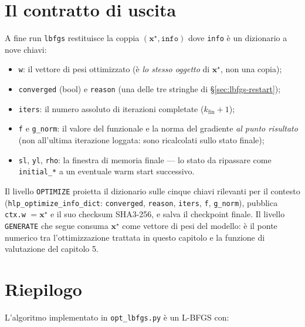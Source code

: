 \section{Il contratto di uscita}

A fine run \texttt{lbfgs} restituisce la coppia
$(\bm{x}^{\star}, \texttt{info})$ dove \texttt{info} è un dizionario a
nove chiavi:
\begin{itemize}
\item \texttt{w}: il vettore di pesi ottimizzato (è \emph{lo stesso
  oggetto} di $\bm{x}^{\star}$, non una copia);
\item \texttt{converged} (bool) e \texttt{reason} (una delle tre stringhe
  di \S\ref{sec:lbfgs-restart});
\item \texttt{iters}: il numero assoluto di iterazioni completate
  ($k_{\mathrm{fin}} + 1$);
\item \texttt{f} e \texttt{g\_norm}: il valore del funzionale e la norma
  del gradiente \emph{al punto risultato} (non all'ultima iterazione
  loggata: sono ricalcolati sullo stato finale);
\item \texttt{sl}, \texttt{yl}, \texttt{rho}: la finestra di memoria
  finale — lo stato da ripassare come \texttt{initial\_*} a un eventuale
  warm start successivo.
\end{itemize}

Il livello \texttt{OPTIMIZE} proietta il dizionario sulle cinque chiavi
rilevanti per il contesto (\texttt{hlp\_optimize\_info\_dict}:
\texttt{converged}, \texttt{reason}, \texttt{iters}, \texttt{f},
\texttt{g\_norm}), pubblica \texttt{ctx.w} $= \bm{x}^{\star}$ e il suo
checksum SHA3-256, e salva il checkpoint finale. Il livello
\texttt{GENERATE} che segue consuma $\bm{x}^{\star}$ come vettore di
pesi del modello: è il ponte numerico tra l'ottimizzazione trattata in
questo capitolo e la funzione di valutazione del capitolo 5.

\section{Riepilogo}

L'algoritmo implementato in \texttt{opt\_lbfgs.py} è un L-BFGS con:

